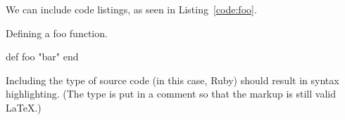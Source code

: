 We can include code listings, as seen in Listing~\ref{code:foo}.

\begin{codelisting}
\label{code:foo}
Defining a foo function.
\begin{code}
def foo
  "bar"
end
\end{code}
\end{codelisting}

Including the type of source code (in this case, Ruby) should result in syntax highlighting. (The type is put in a comment so that the markup is still valid \LaTeX.)